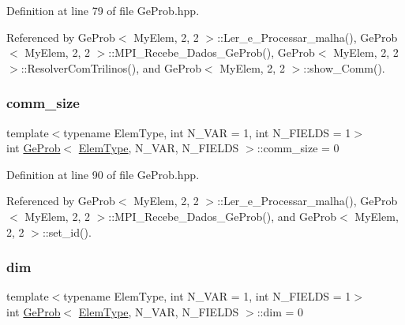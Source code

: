 Definition at line 79 of file Ge\+Prob.\+hpp.



Referenced by Ge\+Prob$<$ My\+Elem, 2, 2 $>$\+::\+Ler\+\_\+e\+\_\+\+Processar\+\_\+malha(), Ge\+Prob$<$ My\+Elem, 2, 2 $>$\+::\+M\+P\+I\+\_\+\+Recebe\+\_\+\+Dados\+\_\+\+Ge\+Prob(), Ge\+Prob$<$ My\+Elem, 2, 2 $>$\+::\+Resolver\+Com\+Trilinos(), and Ge\+Prob$<$ My\+Elem, 2, 2 $>$\+::show\+\_\+\+Comm().

\mbox{\label{classGeProb_ab5aa970c9864597a442bfc8519352730}} 
\subsubsection{\texorpdfstring{comm\+\_\+size}{comm\_size}}
{\footnotesize\ttfamily template$<$typename Elem\+Type, int N\+\_\+\+V\+AR = 1, int N\+\_\+\+F\+I\+E\+L\+DS = 1$>$ \\
int \hyperlink{classGeProb}{Ge\+Prob}$<$ \hyperlink{spectral_8h_aaa2c1a7b2d1b12c590d730fe6ac839fa}{Elem\+Type}, N\+\_\+\+V\+AR, N\+\_\+\+F\+I\+E\+L\+DS $>$\+::comm\+\_\+size = 0\hspace{0.3cm}{\ttfamily [protected]}}



Definition at line 90 of file Ge\+Prob.\+hpp.



Referenced by Ge\+Prob$<$ My\+Elem, 2, 2 $>$\+::\+Ler\+\_\+e\+\_\+\+Processar\+\_\+malha(), Ge\+Prob$<$ My\+Elem, 2, 2 $>$\+::\+M\+P\+I\+\_\+\+Recebe\+\_\+\+Dados\+\_\+\+Ge\+Prob(), and Ge\+Prob$<$ My\+Elem, 2, 2 $>$\+::set\+\_\+id().

\mbox{\label{classGeProb_a122f6dbb7e9a60a35f257ae369a57f77}} 
\subsubsection{\texorpdfstring{dim}{dim}}
{\footnotesize\ttfamily template$<$typename Elem\+Type, int N\+\_\+\+V\+AR = 1, int N\+\_\+\+F\+I\+E\+L\+DS = 1$>$ \\
int \hyperlink{classGeProb}{Ge\+Prob}$<$ \hyperlink{spectral_8h_aaa2c1a7b2d1b12c590d730fe6ac839fa}{Elem\+Type}, N\+\_\+\+V\+AR, N\+\_\+\+F\+I\+E\+L\+DS $>$\+::dim = 0\hspace{0.3cm}{\ttfamily [protected]}}




